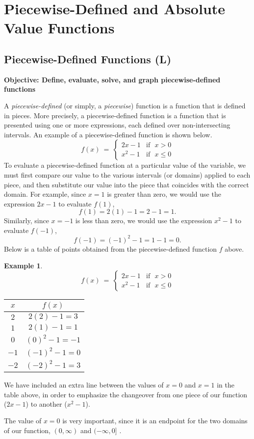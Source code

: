 \documentclass[12pt]{book}
\theoremstyle{definition}
\newtheorem{example}{Example}
\begin{document}
\section{Piecewise-Defined and Absolute Value Functions}
\subsection{Piecewise-Defined Functions (L)}
{\bf Objective: Define, evaluate, solve, and graph piecewise-defined functions}\par
A {\it piecewise-defined} (or simply, a {\it piecewise}) function is a function that is defined in pieces.  More precisely, a piecewise-defined function is a function that is presented using one or more expressions, each defined over non-intersecting intervals.  An example of a piecewise-defined function is shown below.
\[ f(x)~=~
	\begin{cases} 
      2x-1 & \text{if~~} x> 0\\
			x^2-1 & \text{if~~} x\leq 0
  \end{cases}
\]
To evaluate a piecewise-defined function at a particular value of the variable, we must first compare our value to the various intervals (or domains) applied to each piece, and then substitute our value into the piece that coincides with the correct domain.  For example, since $x=1$ is greater than zero, we would use the expression $2x-1$ to evaluate $f(1)$,
$$f(1)=2(1)-1=2-1=1.$$
Similarly, since $x=-1$ is less than zero, we would use the expression $x^2-1$ to evaluate $f(-1)$,
$$f(-1)=(-1)^2-1=1-1=0.$$
Below is a table of points obtained from the piecewise-defined function $f$ above. 
\begin{example} 
\[ f(x)~=~
	\begin{cases} 
      2x-1 & \text{if~~} x> 0\\
			x^2-1 & \text{if~~} x\leq 0
  \end{cases}
\]
\end{example}
\begin{multicols}{2}
\begin{center}
\begin{tabular}{c|c}
	$x$ & $f(x)$\\
	\hline
	$2$ & $2(2)-1=3$\\
	\hline
	$1$ & $2(1)-1=1$\\
	\hline \hline
	$0$ & $(0)^2-1=-1$\\
	\hline
	$-1$ & $(-1)^2-1=0$\\
	\hline
	$-2$ & $(-2)^2-1=3$
\end{tabular}
\end{center}

\columnbreak

We have included an extra line between the values of $x=0$ and $x=1$ in the table above, in order to emphasize the changeover from one piece of our function ($2x-1$) to another ($x^2-1$).\par
The value of $x=0$ is very important, since it is an endpoint for the two domains of our function,  $(0,\infty)$ and $(-\infty,0]$ .  
\end{multicols}
\end{document}
